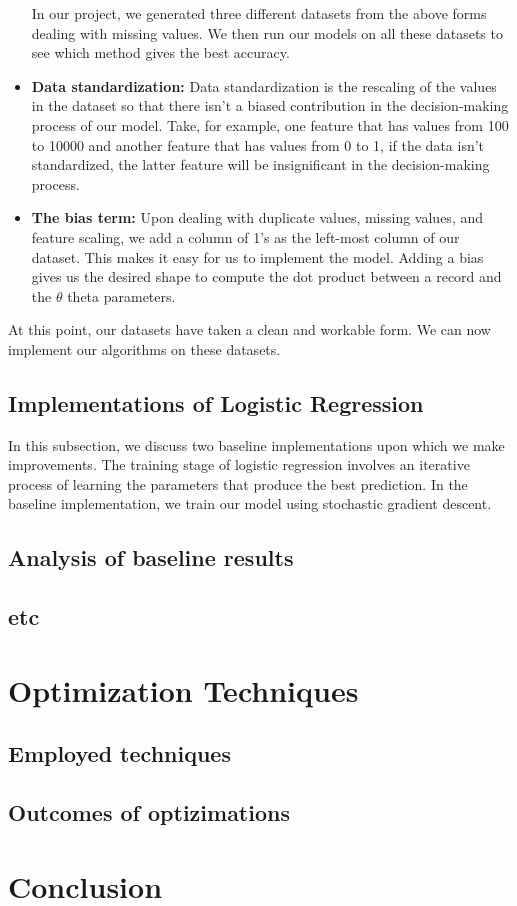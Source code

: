 \begin{itemize}
\begin{itemize}
        \end{itemize}
        In our project, we generated three different datasets from the above forms dealing with missing values. We then run our models on all these datasets to see which method gives the best accuracy.
    \item \textbf{Data standardization: }Data standardization is the rescaling of the values in the dataset so that there isn't a biased contribution in the decision-making process of our model. Take, for example, one feature that has values from 100 to 10000 and another feature that has values from 0 to 1, if the data isn't standardized, the latter feature will be insignificant in the decision-making process. 
    \item \textbf{The bias term: } Upon dealing with duplicate values, missing values, and feature scaling, we add a column of 1's as the left-most column of our dataset. This makes it easy for us to implement the model. Adding a bias gives us the desired shape to compute the dot product between a record and the $\theta$ theta parameters.
\end{itemize}
At this point, our datasets have taken a clean and workable form. We can now implement our algorithms on these datasets.

\subsection{Implementations of Logistic Regression}
In this subsection, we discuss two baseline implementations upon which we make improvements. The training stage of logistic regression involves an iterative process of learning the parameters that produce the best prediction. In the baseline implementation, we train our model using stochastic gradient descent. 
\subsection{Analysis of baseline results}

\subsection{etc}


\section{Optimization Techniques}
\subsection{Employed techniques}

\subsection{Outcomes of optizimations}



\newpage
\section{Conclusion}

